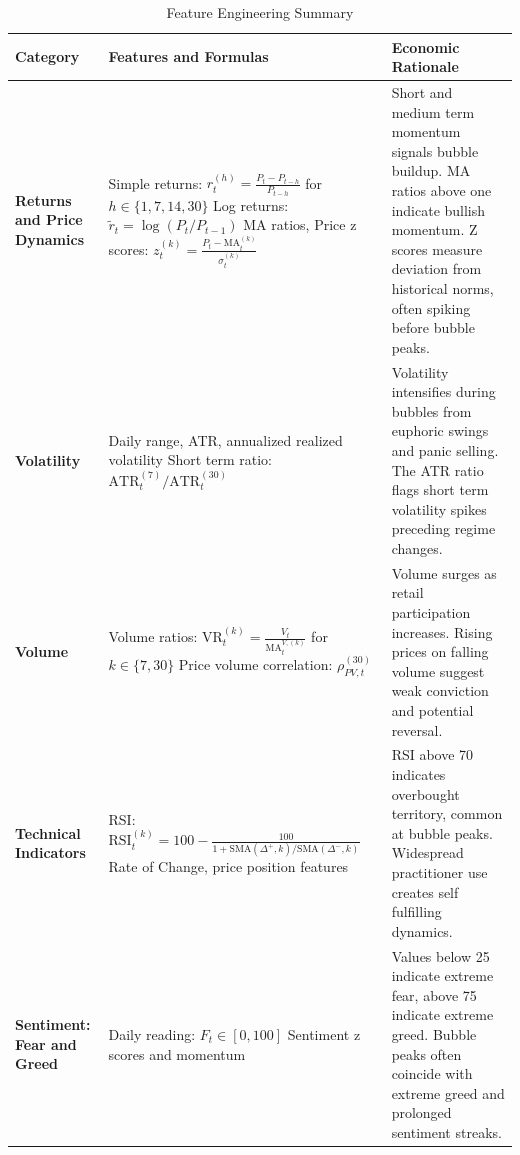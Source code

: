 \documentclass[12pt,a4paper]{article}
\begin{document}
\begin{table}[h]
\centering
\small
\caption{Feature Engineering Summary}
\label{tab:feature_summary}
\renewcommand{\arraystretch}{1.3}
\begin{tabular}{p{2.5cm} p{5.2cm} p{6.5cm}}
\toprule
\textbf{Category} & \textbf{Features and Formulas} & \textbf{Economic Rationale} \\
\midrule

\textbf{Returns and Price Dynamics} & 
Simple returns: $r_t^{(h)} = \frac{P_t - P_{t-h}}{P_{t-h}}$ for $h \in \{1,7,14,30\}$ \newline
Log returns: $\tilde{r}_t = \log(P_t/P_{t-1})$ \newline
MA ratios, Price z scores: $z_t^{(k)} = \frac{P_t - \text{MA}_t^{(k)}}{\sigma_t^{(k)}}$ & 
Short and medium term momentum signals bubble buildup. MA ratios above one indicate bullish momentum. Z scores measure deviation from historical norms, often spiking before bubble peaks. \\

\textbf{Volatility} & 
Daily range, ATR, annualized realized volatility \newline
Short term ratio: $\text{ATR}_t^{(7)} / \text{ATR}_t^{(30)}$ & 
Volatility intensifies during bubbles from euphoric swings and panic selling. The ATR ratio flags short term volatility spikes preceding regime changes. \\

\textbf{Volume} & 
Volume ratios: $\text{VR}_t^{(k)} = \frac{V_t}{\text{MA}_t^{V,(k)}}$ for $k \in \{7, 30\}$ \newline
Price volume correlation: $\rho_{PV,t}^{(30)}$ & 
Volume surges as retail participation increases. Rising prices on falling volume suggest weak conviction and potential reversal. \\

\textbf{Technical Indicators} & 
RSI: $\text{RSI}_t^{(k)} = 100 - \frac{100}{1 + \text{SMA}(\Delta^+,k)/\text{SMA}(\Delta^-,k)}$ \newline
Rate of Change, price position features & 
RSI above 70 indicates overbought territory, common at bubble peaks. Widespread practitioner use creates self fulfilling dynamics. \\

\textbf{Sentiment: Fear and Greed} & 
Daily reading: $F_t \in [0,100]$ \newline
Sentiment z scores and momentum & 
Values below 25 indicate extreme fear, above 75 indicate extreme greed. Bubble peaks often coincide with extreme greed and prolonged sentiment streaks. \\


\end{tabular}
\end{table}
\end{document}
